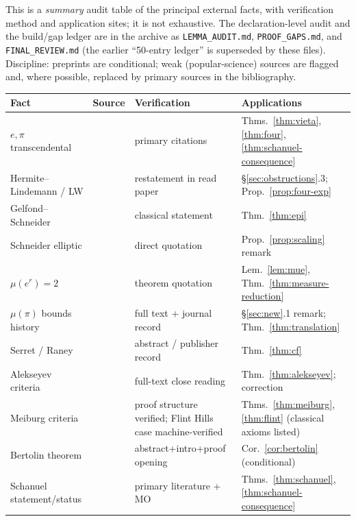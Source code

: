 \documentclass[11pt]{amsart}
\theoremstyle{definition}
\theoremstyle{remark}
\numberwithin{equation}{section}
\newcommand{\irr}{\mu}
\newcommand{\ee}{e}
\begin{document}
This is a \emph{summary} audit table of the principal external facts, with verification method and application sites; it is not exhaustive. The declaration-level audit and the build/gap ledger are in the archive as \texttt{LEMMA\_AUDIT.md}, \texttt{PROOF\_GAPS.md}, and \texttt{FINAL\_REVIEW.md} (the earlier ``50-entry ledger'' is superseded by these files). Discipline: preprints are conditional; weak (popular-science) sources are flagged and, where possible, replaced by primary sources in the bibliography.

\begin{center}
\footnotesize\begin{tabularx}{\textwidth}{@{}p{}p{}p{}X@{}}
\toprule
Fact & Source & Verification & Applications \\
\midrule
$\ee,\pi$ transcendental & \cite{Hermite1873,Lindemann1882} & primary citations & Thms.~\ref{thm:vieta},\ref{thm:four},\ref{thm:schanuel-consequence} \\
Hermite--Lindemann / LW & \cite{Lindemann1882,Bertolin2026} & restatement in read paper & \S\ref{sec:obstructions}.3; Prop.~\ref{prop:four-exp} \\
Gelfond--Schneider & \cite{GS1934} & classical statement & Thm.~\ref{thm:epi} \\
Schneider elliptic & \cite{Duke} & direct quotation & Prop.~\ref{prop:scaling} remark \\
$\irr(\ee^r)=2$ & \cite{CNU2024} & theorem quotation & Lem.~\ref{lem:mue}, Thm.~\ref{thm:measure-reduction} \\
$\irr(\pi)$ bounds history & \cite{Alekseyev2011,ZZ2020} & full text + journal record & \S\ref{sec:new}.1 remark; Thm.~\ref{thm:translation} \\
Serret / Raney & \cite{Panti2017,Raney1973} & abstract / publisher record & Thm.~\ref{thm:cf} \\
Alekseyev criteria & \cite{Alekseyev2011} & full-text close reading & Thm.~\ref{thm:alekseyev}; correction \\
Meiburg criteria & \cite{Meiburg2022} & proof structure verified; Flint Hills case machine-verified & Thms.~\ref{thm:meiburg},\ref{thm:flint} (classical axioms listed) \\
Bertolin theorem & \cite{Bertolin2026} & abstract+intro+proof opening & Cor.~\ref{cor:bertolin} (conditional) \\
Schanuel statement/status & \cite{Ax1971,Baker,MO33817} & primary literature + MO & Thms.~\ref{thm:schanuel},\ref{thm:schanuel-consequence} \\

\end{tabularx}
\end{center}
\end{document}

